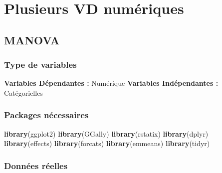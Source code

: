 \documentclass[
]{book}
\newenvironment{Shaded}{\begin{snugshade}}{\end{snugshade}}
\newcommand{\KeywordTok}[1]{\textcolor[rgb]{0.13,0.29,0.53}{\textbf{#1}}}
\newcommand{\NormalTok}[1]{#1}
\begin{document}
\hypertarget{plusieurs-vd-numuxe9riques}{%
\section{Plusieurs VD numériques}\label{plusieurs-vd-numuxe9riques}}

\hypertarget{manova}{%
\subsection{MANOVA}\label{manova}}

\hypertarget{type-de-variables-20}{%
\subsubsection{Type de variables}\label{type-de-variables-20}}

\textbf{Variables Dépendantes :} Numérique
\textbf{Variables Indépendantes :} Catégorielles

\hypertarget{packages-nuxe9cessaires-20}{%
\subsubsection{Packages nécessaires}\label{packages-nuxe9cessaires-20}}

\begin{Shaded}
\begin{Highlighting}[]
\KeywordTok{library}\NormalTok{(ggplot2)}
\KeywordTok{library}\NormalTok{(GGally)}
\KeywordTok{library}\NormalTok{(rstatix)}
\KeywordTok{library}\NormalTok{(dplyr)}
\KeywordTok{library}\NormalTok{(effects)}
\KeywordTok{library}\NormalTok{(forcats)}
\KeywordTok{library}\NormalTok{(emmeans)}
\KeywordTok{library}\NormalTok{(tidyr)}
\end{Highlighting}
\end{Shaded}

\hypertarget{donnuxe9es-ruxe9elles-20}{%
\subsubsection{Données réelles}\label{donnuxe9es-ruxe9elles-20}}
\end{document}
